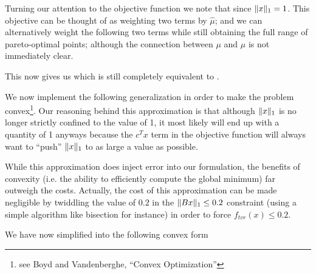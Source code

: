\documentclass{article}
\begin{document}
    Turning our attention to the objective function we note that
        since $\|x\|_1 = 1$.
    This objective can be thought of as 
        weighting two terms by $\hat{\mu}$;
        and we can alternatively weight the following two terms
        while still obtaining the full range of pareto-optimal points;
        although the connection between $\mu$ and $\hat{\mu}$
        is not immediately clear.

    This now gives us
        which is still completely equivalent to .

    We now implement the following generalization
        in order to make the problem 
        convex\footnote{see Boyd and Vandenberghe, ``Convex Optimization''}.
    Our reasoning behind this approximation
        is that although $\|x\|_1$ is no longer 
        strictly confined to the value of 1,
        it most likely will end up with a quantity of 1 anyways
        because the $c^T x$ term in the objective function will always want
        to ``push'' $\|x\|_1$ to as large a value as possible.

    While this approximation does inject error into our formulation,
        the benefits of convexity (i.e. the ability to efficiently compute
        the global minimum) far outweigh the costs.
    Actually, the cost of this approximation can be made negligible by
        twiddling the value of $0.2$ 
        in the $\|Bx\|_1 \le 0.2$ constraint 
        (using a simple algorithm like bisection for instance)
        in order to force $f_{tvr}(x) \le 0.2$.
    
    We have now simplified  into the following convex form
    
    
\end{document}
